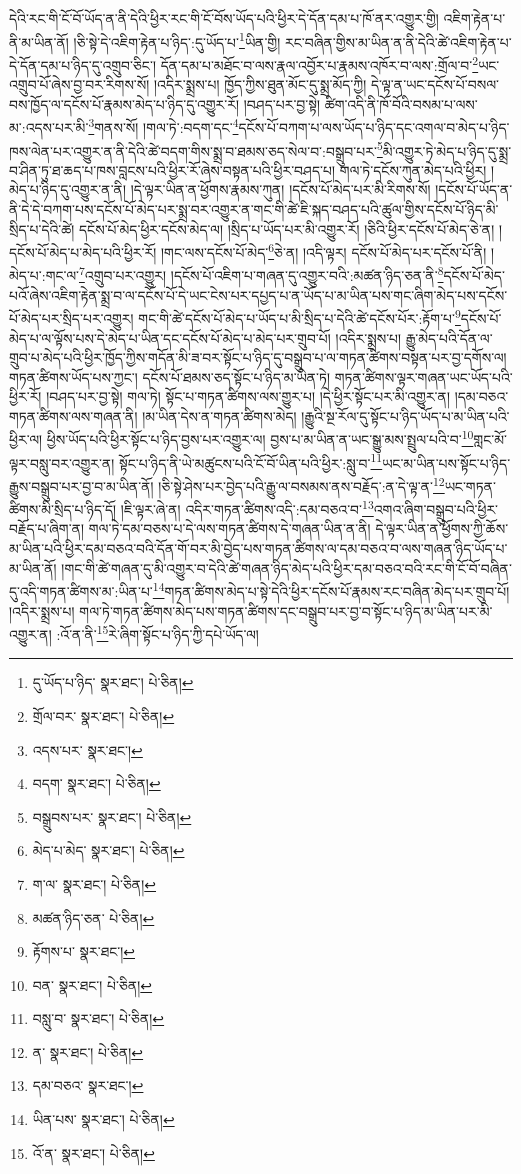དེའི་རང་གི་ངོ་བོ་ཡོད་ན་ནི་དེའི་ཕྱིར་རང་གི་ངོ་བོས་ཡོད་པའི་ཕྱིར་དེ་དོན་དམ་པ་ཁོ་ནར་འགྱུར་གྱི། འཇིག་རྟེན་པ་ནི་མ་ཡིན་ནོ། །ཅི་སྟེ་དེ་འཇིག་རྟེན་པ་ཉིད་:དུ་ཡོད་པ་\footnote{དུ་ཡོད་པ་ཉིད་  སྣར་ཐང་།  པེ་ཅིན། }ཡིན་གྱི། རང་བཞིན་གྱིས་མ་ཡིན་ན་ནི་དེའི་ཚེ་འཇིག་རྟེན་པ་དེ་དོན་དམ་པ་ཉིད་དུ་འགྲུབ་ཅིང་། དོན་དམ་པ་མཐོང་བ་ལས་རྣལ་འབྱོར་པ་རྣམས་འཁོར་བ་ལས་:གྲོལ་བ་\footnote{གྲོལ་བར་  སྣར་ཐང་།  པེ་ཅིན། }ཡང་འགྲུབ་པོ་ཞེས་བྱ་བར་རིགས་སོ། །འདིར་སྨྲས་པ། ཁྱོད་ཀྱིས་ཐུན་མོང་དུ་སྨྲ་མོད་ཀྱི། དེ་ལྟ་ན་ཡང་དངོས་པོ་བསལ་བས་ཁྱོད་ལ་དངོས་པོ་རྣམས་མེད་པ་ཉིད་དུ་འགྱུར་རོ། །བཤད་པར་བྱ་སྟེ། ཚིག་འདི་ནི་ཁོ་བོའི་བསམ་པ་ལས་མ་:འདས་པར་མི་\footnote{འདས་པར་  སྣར་ཐང་། }གནས་སོ། །གལ་ཏེ་:བདག་དང་\footnote{བདག་  སྣར་ཐང་།  པེ་ཅིན། }དངོས་པོ་བཀག་པ་ལས་ཡོད་པ་ཉིད་དང་འགལ་བ་མེད་པ་ཉིད་ཁས་ལེན་པར་འགྱུར་ན་ནི་དེའི་ཚེ་བདག་གིས་སྨྲ་བ་ཐམས་ཅད་སེལ་བ་:བསྒྲུབ་པར་\footnote{བསྒྲུབས་པར་  སྣར་ཐང་།  པེ་ཅིན། }མི་འགྱུར་ཏེ་མེད་པ་ཉིད་དུ་སྨྲ་བ་ཤིན་ཏུ་ཐ་ཆད་པ་ཁས་བླངས་པའི་ཕྱིར་རོ་ཞེས་བསྟན་པའི་ཕྱིར་བཤད་པ། གལ་ཏེ་དངོས་ཀུན་མེད་པའི་ཕྱིར། །མེད་པ་ཉིད་དུ་འགྱུར་ན་ནི། །དེ་ལྟར་ཡིན་ན་ཕྱོགས་རྣམས་ཀུན། །དངོས་པོ་མེད་པར་མི་རིགས་སོ། །དངོས་པོ་ཡོད་ན་ནི་དེ་དེ་བཀག་པས་དངོས་པོ་མེད་པར་སྨྲ་བར་འགྱུར་ན་གང་གི་ཚེ་ཇི་སྐད་བཤད་པའི་ཚུལ་གྱིས་དངོས་པོ་ཉིད་མི་སྲིད་པ་དེའི་ཚེ། དངོས་པོ་མེད་ཕྱིར་དངོས་མེད་ལ། །སྲིད་པ་ཡོད་པར་མི་འགྱུར་རོ། །ཅིའི་ཕྱིར་དངོས་པོ་མེད་ཅེ་ན། །དངོས་པོ་མེད་པ་མེད་པའི་ཕྱིར་རོ། །གང་ལས་དངོས་པོ་མེད་\footnote{མེད་པ་མེད་  སྣར་ཐང་།  པེ་ཅིན། }ཅེ་ན། །འདི་ལྟར། དངོས་པོ་མེད་པར་དངོས་པོ་ནི། །མེད་པ་:གང་ལ་\footnote{ག་ལ་  སྣར་ཐང་།  པེ་ཅིན། }འགྲུབ་པར་འགྱུར། །དངོས་པོ་འཇིག་པ་གཞན་དུ་འགྱུར་བའི་:མཚན་ཉིད་ཅན་ནི་\footnote{མཚན་ཉིད་ཅན་  པེ་ཅིན། }དངོས་པོ་མེད་པའོ་ཞེས་འཇིག་རྟེན་སྨྲ་བ་ལ་དངོས་པོ་དེ་ཡང་ངེས་པར་དཔྱད་པ་ན་ཡོད་པ་མ་ཡིན་པས་གང་ཞིག་མེད་པས་དངོས་པོ་མེད་པར་སྲིད་པར་འགྱུར། གང་གི་ཚེ་དངོས་པོ་མེད་པ་ཡོད་པ་མི་སྲིད་པ་དེའི་ཚེ་དངོས་པོར་:རྟོག་པ་\footnote{རྟོགས་པ་  སྣར་ཐང་། }དངོས་པོ་མེད་པ་ལ་ལྟོས་པས་དེ་མེད་པ་ཡིན་དང་དངོས་པོ་མེད་པ་མེད་པར་གྲུབ་པོ། །འདིར་སྨྲས་པ། རྒྱུ་མེད་པའི་དོན་ལ་གྲུབ་པ་མེད་པའི་ཕྱིར་ཁྱོད་ཀྱིས་གདོན་མི་ཟ་བར་སྟོང་པ་ཉིད་དུ་བསྒྲུབ་པ་ལ་གཏན་ཚིགས་བསྟན་པར་བྱ་དགོས་ལ། གཏན་ཚིགས་ཡོད་པས་ཀྱང་། དངོས་པོ་ཐམས་ཅད་སྟོང་པ་ཉིད་མ་ཡིན་ཏེ། གཏན་ཚིགས་ལྟར་གཞན་ཡང་ཡོད་པའི་ཕྱིར་རོ། །བཤད་པར་བྱ་སྟེ། གལ་ཏེ། སྟོང་པ་གཏན་ཚིགས་ལས་གྱུར་པ། །དེ་ཕྱིར་སྟོང་པར་མི་འགྱུར་ན། །དམ་བཅའ་གཏན་ཚིགས་ལས་གཞན་ནི། །མ་ཡིན་དེས་ན་གཏན་ཚིགས་མེད། །རྒྱུའི་སྔ་རོལ་དུ་སྟོང་པ་ཉིད་ཡོད་པ་མ་ཡིན་པའི་ཕྱིར་ལ། ཕྱིས་ཡོད་པའི་ཕྱིར་སྟོང་པ་ཉིད་བྱས་པར་འགྱུར་ལ། བྱས་པ་མ་ཡིན་ན་ཡང་སྒྱུ་མས་སྤྲུལ་པའི་བ་\footnote{བན་  སྣར་ཐང་།  པེ་ཅིན། }གླང་མོ་ལྟར་བསླུ་བར་འགྱུར་ན། སྟོང་པ་ཉིད་ནི་ཡེ་མཚུངས་པའི་ངོ་བོ་ཡིན་པའི་ཕྱིར་:སླུ་བ་\footnote{བསླུ་བ་  སྣར་ཐང་།  པེ་ཅིན། }ཡང་མ་ཡིན་པས་སྟོང་པ་ཉིད་རྒྱུས་བསྒྲུབ་པར་བྱ་བ་མ་ཡིན་ནོ། །ཅི་སྟེ་ཤེས་པར་བྱེད་པའི་རྒྱུ་ལ་བསམས་ནས་བརྗོད་:ན་དེ་ལྟ་ན་\footnote{ན་  སྣར་ཐང་།  པེ་ཅིན། }ཡང་གཏན་ཚིགས་མི་སྲིད་པ་ཉིད་དོ། །ཇི་ལྟར་ཞེ་ན། འདིར་གཏན་ཚིགས་འདི་:དམ་བཅའ་བ་\footnote{དམ་བཅའ་  སྣར་ཐང་། }འགའ་ཞིག་བསྒྲུབ་པའི་ཕྱིར་བརྗོད་པ་ཞིག་ན། གལ་ཏེ་དམ་བཅས་པ་དེ་ལས་གཏན་ཚིགས་དེ་གཞན་ཡིན་ན་ནི། དེ་ལྟར་ཡིན་ན་ཕྱོགས་ཀྱི་ཆོས་མ་ཡིན་པའི་ཕྱིར་དམ་བཅའ་བའི་དོན་གོ་བར་མི་བྱེད་པས་གཏན་ཚིགས་ལ་དམ་བཅའ་བ་ལས་གཞན་ཉིད་ཡོད་པ་མ་ཡིན་ནོ། །གང་གི་ཚེ་གཞན་དུ་མི་འགྱུར་བ་དེའི་ཚེ་གཞན་ཉིད་མེད་པའི་ཕྱིར་དམ་བཅའ་བའི་རང་གི་ངོ་བོ་བཞིན་དུ་འདི་གཏན་ཚིགས་མ་:ཡིན་པ་\footnote{ཡིན་པས་  སྣར་ཐང་།  པེ་ཅིན། }གཏན་ཚིགས་མེད་པ་སྟེ་དེའི་ཕྱིར་དངོས་པོ་རྣམས་རང་བཞིན་མེད་པར་གྲུབ་པོ། །འདིར་སྨྲས་པ། གལ་ཏེ་གཏན་ཚིགས་མེད་པས་གཏན་ཚིགས་དང་བསྒྲུབ་པར་བྱ་བ་སྟོང་པ་ཉིད་མ་ཡིན་པར་མི་འགྱུར་ན། :འོ་ན་ནི་\footnote{འོ་ན་  སྣར་ཐང་།  པེ་ཅིན། }རེ་ཞིག་སྟོང་པ་ཉིད་ཀྱི་དཔེ་ཡོད་ལ། 